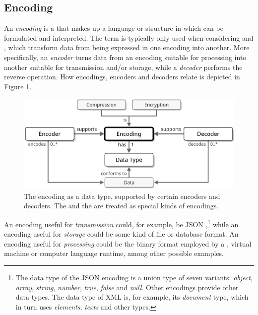 \subsection{Encoding}
\label{sec:concepts:encoding}

An \textit{encoding} is a  that makes up a language or structure in which  can be formulated and interpreted.
The term is typically only used when considering  and , which transform data from being expressed in one encoding into another.
More specifically, an \textit{encoder} turns data from an encoding suitable for processing into another suitable for transmission and/or storage, while a \textit{decoder} performs the reverse operation.
How encodings, encoders and decoders relate is depicted in Figure \ref{fig:encoding}.

\vfill

\begin{figure}[ht!]
  \centering
  \includegraphics[scale=0.9]{figures/encoding}
  \caption{
    The encoding as a data type, supported by certain encoders and decoders.
    The  and the  are treated as special kinds of encodings.
  }
  \label{fig:encoding}
\end{figure}

\vfill

An encoding useful for \textit{transmission} could, for example, be JSON \cite{rfc7159},\footnote{
  The data type of the JSON encoding is a union type of seven variants: \textit{object}, \textit{array}, \textit{string}, \textit{number}, \textit{true}, \textit{false} and \textit{null}.
  Other encodings provide other data types.
  The data type of XML \cite{w3c2008xml} is, for example, its \textit{document} type, which in turn uses \textit{elements}, \textit{texts} and other types.
} while an encoding useful for \textit{storage} could be some kind of file or database format.
An encoding useful for \textit{processing} could be the binary format employed by a , virtual machine or computer language runtime, among other possible examples.

